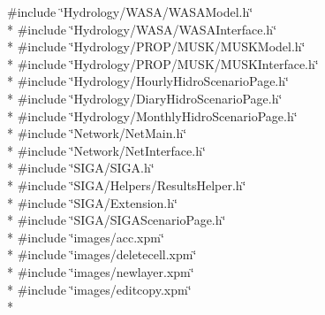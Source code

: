 {\ttfamily \#include \char`\"{}Hydrology/\+W\+A\+S\+A/\+W\+A\+S\+A\+Model.\+h\char`\"{}}\\*
{\ttfamily \#include \char`\"{}Hydrology/\+W\+A\+S\+A/\+W\+A\+S\+A\+Interface.\+h\char`\"{}}\\*
{\ttfamily \#include \char`\"{}Hydrology/\+P\+R\+O\+P/\+M\+U\+S\+K/\+M\+U\+S\+K\+Model.\+h\char`\"{}}\\*
{\ttfamily \#include \char`\"{}Hydrology/\+P\+R\+O\+P/\+M\+U\+S\+K/\+M\+U\+S\+K\+Interface.\+h\char`\"{}}\\*
{\ttfamily \#include \char`\"{}Hydrology/\+Hourly\+Hidro\+Scenario\+Page.\+h\char`\"{}}\\*
{\ttfamily \#include \char`\"{}Hydrology/\+Diary\+Hidro\+Scenario\+Page.\+h\char`\"{}}\\*
{\ttfamily \#include \char`\"{}Hydrology/\+Monthly\+Hidro\+Scenario\+Page.\+h\char`\"{}}\\*
{\ttfamily \#include \char`\"{}Network/\+Net\+Main.\+h\char`\"{}}\\*
{\ttfamily \#include \char`\"{}Network/\+Net\+Interface.\+h\char`\"{}}\\*
{\ttfamily \#include \char`\"{}S\+I\+G\+A/\+S\+I\+G\+A.\+h\char`\"{}}\\*
{\ttfamily \#include \char`\"{}S\+I\+G\+A/\+Helpers/\+Results\+Helper.\+h\char`\"{}}\\*
{\ttfamily \#include \char`\"{}S\+I\+G\+A/\+Extension.\+h\char`\"{}}\\*
{\ttfamily \#include \char`\"{}S\+I\+G\+A/\+S\+I\+G\+A\+Scenario\+Page.\+h\char`\"{}}\\*
{\ttfamily \#include \char`\"{}images/acc.\+xpm\char`\"{}}\\*
{\ttfamily \#include \char`\"{}images/deletecell.\+xpm\char`\"{}}\\*
{\ttfamily \#include \char`\"{}images/newlayer.\+xpm\char`\"{}}\\*
{\ttfamily \#include \char`\"{}images/editcopy.\+xpm\char`\"{}}\\*
